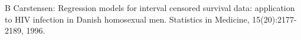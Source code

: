 \begin{References}\relax
B Carstensen: Regression models for interval censored
survival data: application to HIV infection in Danish homosexual
men. Statistics in Medicine, 15(20):2177-2189, 1996.
\end{References}
\begin{SeeAlso}\relax
{}
\end{SeeAlso}
\begin{Examples}
\begin{ExampleCode}
  \end{ExampleCode}
\end{Examples}

